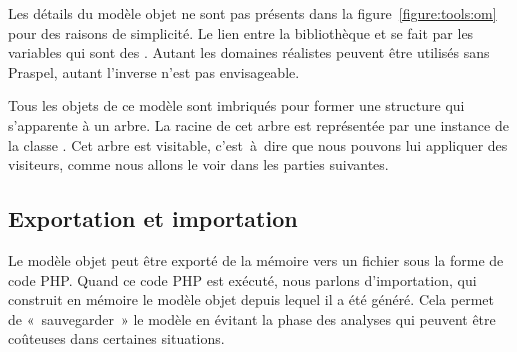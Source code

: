 Les détails du modèle objet ne sont pas présents dans la
figure~\ref{figure:tools:om} pour des raisons de simplicité. Le lien entre la
bibliothèque  et  se fait
par les variables qui sont des . Autant les domaines
réalistes peuvent être utilisés sans Praspel, autant l'inverse n'est pas
envisageable.

Tous les objets de ce modèle sont imbriqués pour former une structure qui
s'apparente à un arbre. La racine de cet arbre est représentée par une instance
de la classe . Cet arbre est visitable, c'est~à~dire que
nous pouvons lui appliquer des visiteurs, comme nous allons le voir dans les
parties suivantes.

\subsection{Exportation et importation}
\label{subsection:tools:compilation}

Le modèle objet peut être exporté de la mémoire vers un fichier sous la forme de
code PHP. Quand ce code PHP est exécuté, nous parlons d'importation, qui
construit en mémoire le modèle objet depuis lequel il a été généré. Cela permet
de «~sauvegarder~» le modèle en évitant la phase des analyses qui peuvent être
coûteuses dans certaines situations.

